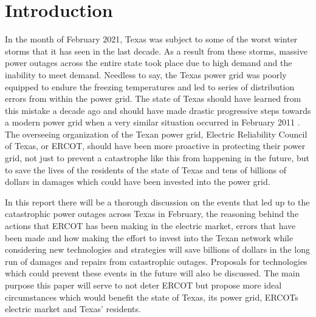 \documentclass[12pt]{article}
\begin{document}
\section{Introduction}
\indent %
\indent In the month of February 2021, Texas was subject to some of the worst winter storms that it has seen in the last decade. As a result from these storms, massive power outages across the entire state took place due to high demand and the inability to meet demand. Needless to say, the Texas power grid was poorly equipped to endure the freezing temperatures and led to series of distribution errors from within the power grid. The state of Texas should have learned from this mistake a decade ago and should have made drastic progressive steps towards a modern power grid when a very similar situation occurred in February 2011 \cite{TexasMonthly}. The overseeing organization of the Texan power grid, Electric Reliability Council of Texas, or ERCOT, should have been more proactive in protecting their power grid, not just to prevent a catastrophe like this from happening in the future, but to save the lives of the residents of the state of Texas and tens of billions of dollars in damages which could have been invested into the power grid. \par
\indent In this report there will be a thorough discussion on the events that led up to the catastrophic power outages across Texas in February, the reasoning behind the actions that ERCOT has been making in the electric market, errors that have been made and how making the effort to invest into the Texan network while considering new technologies and strategies will save billions of dollars in the long run of damages and repairs from catastrophic outages. Proposals for technologies which could prevent these events in the future will also be discussed. The main purpose this paper will serve to not deter ERCOT but propose more ideal circumstances which would benefit the state of Texas, its power grid, ERCOTs electric market and Texas' residents. \par 
\clearpage
\end{document}
